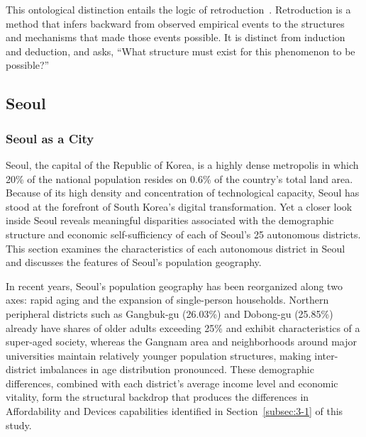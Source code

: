 This ontological distinction entails the logic of retroduction~\citep{Bhaskar1975}. Retroduction is a method that infers backward from observed empirical events to the structures and mechanisms that made those events possible. It is distinct from induction and deduction, and asks, \enquote{What structure must exist for this phenomenon to be possible?}

\subsection{Seoul}
\label{subsec:2-2}

\subsubsection{Seoul as a City}
\label{subsubsec:2-2-1}

Seoul, the capital of the Republic of Korea, is a highly dense metropolis in which 20\% of the national population resides on 0.6\% of the country's total land area. Because of its high density and concentration of technological capacity, Seoul has stood at the forefront of South Korea's digital transformation. Yet a closer look inside Seoul reveals meaningful disparities associated with the demographic structure and economic self-sufficiency of each of Seoul's 25 autonomous districts. This section examines the characteristics of each autonomous district in Seoul and discusses the features of Seoul's population geography.

In recent years, Seoul's population geography has been reorganized along two axes: rapid aging and the expansion of single-person households. Northern peripheral districts such as Gangbuk-gu (26.03\%) and Dobong-gu (25.85\%) already have shares of older adults exceeding 25\% and exhibit characteristics of a super-aged society, whereas the Gangnam area and neighborhoods around major universities maintain relatively younger population structures, making inter-district imbalances in age distribution pronounced. These demographic differences, combined with each district's average income level and economic vitality, form the structural backdrop that produces the differences in Affordability and Devices capabilities identified in Section~\ref{subsec:3-1} of this study.



